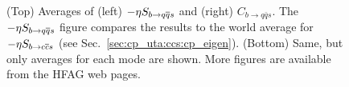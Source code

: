 \begin{figure}[htbp]
\begin{center}
{    }
    \hfill
  \end{center}
  \vspace{-0.8cm}
  \caption{
    (Top)
    Averages of 
    (left) $-\etacp S_{b \to q\bar q s}$ and (right) $C_{b \to q\bar q s}$.
    The $-\etacp S_{b \to q\bar q s}$ figure compares the results to 
    the world average 
    for $-\etacp S_{b \to c\bar c s}$ (see Sec.~\ref{sec:cp_uta:ccs:cp_eigen}).
    (Bottom) Same, but only averages for each mode are shown.
    More figures are available from the HFAG web pages.
  }
  \label{fig:cp_uta:qqs}
\end{figure}

